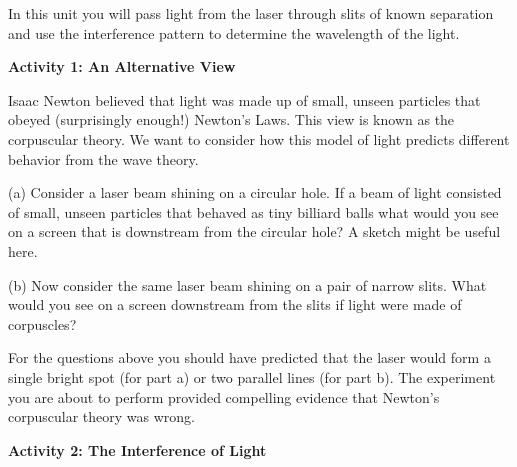 \vspace{0.3cm}
{\centering {} \par}
\vspace{0.3cm}




In this unit you will pass light from the laser through slits of known
separation and use the interference pattern to determine the wavelength
of the light.

\textbf{Activity 1: An Alternative View}

Isaac Newton believed that light was made up of small, unseen particles
that obeyed (surprisingly enough!) Newton's Laws. This view is known
as the corpuscular theory. We want to consider how this model of light
predicts different behavior from the wave theory.

(a) Consider a laser beam shining on a circular hole. If a beam of
light consisted of small, unseen particles that behaved as tiny billiard
balls what would you see on a screen that is downstream from the circular
hole? A sketch might be useful here.
\vspace{35mm}

(b) Now consider the same laser beam shining on a pair of narrow slits.
What would you see on a screen downstream from the slits if light
were made of corpuscles?
\vspace{35mm}

For the questions above you should have predicted that the laser would
form a single bright spot (for part a) or two parallel lines (for part
b). The experiment you are about to perform provided compelling evidence
that Newton's corpuscular theory was wrong. 
\vspace{7mm}

\textbf{Activity 2: The Interference of Light }

